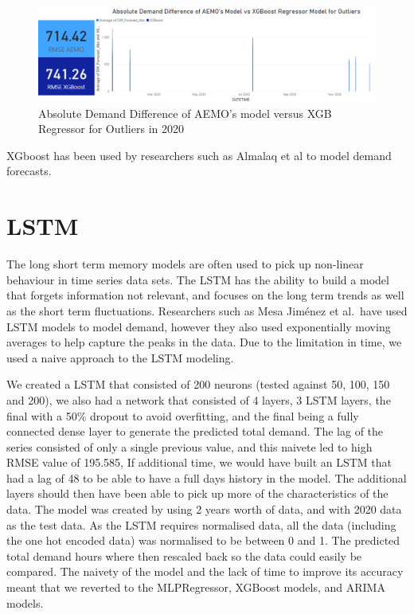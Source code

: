 \documentclass[mstat,12pt]{unswthesis}
\begin{document}
\begin{figure}[H]
\includegraphics[width=140mm]{image24.png}
\caption{Absolute Demand Difference of AEMO's model versus XGB Regressor for Outliers in 2020}
\label{image24}
\end{figure}

XGboost has been used by researchers such as Almalaq et al to model
demand forecasts\cite{almalaq_2017_a}.

\hypertarget{lstm}{%
\section{LSTM}\label{lstm}}

The long short term memory models are often used to pick up non-linear
behaviour in time series data sets. The LSTM has the ability to build a
model that forgets information not relevant, and focuses on the long
term trends as well as the short term fluctuations. Researchers such as
Mesa Jiménez et al.~have used LSTM models to model demand, however they
also used exponentially moving averages to help capture the peaks in the
data. Due to the limitation in time, we used a naive approach to the
LSTM modeling\cite{mesajimnez_2020_modelling}.

We created a LSTM that consisted of 200 neurons (tested against 50, 100,
150 and 200), we also had a network that consisted of 4 layers, 3 LSTM
layers, the final with a 50\% dropout to avoid overfitting, and the
final being a fully connected dense layer to generate the predicted
total demand. The lag of the series consisted of only a single previous
value, and this naivete led to high RMSE value of 195.585, If additional
time, we would have built an LSTM that had a lag of 48 to be able to
have a full days history in the model. The additional layers should then
have been able to pick up more of the characteristics of the data. The
model was created by using 2 years worth of data, and with 2020 data as
the test data. As the LSTM requires normalised data, all the data
(including the one hot encoded data) was normalised to be between 0 and
1. The predicted total demand hours where then rescaled back so the data
could easily be compared. The naivety of the model and the lack of time
to improve its accuracy meant that we reverted to the MLPRegressor,
XGBoost models, and ARIMA models.
\end{document}
